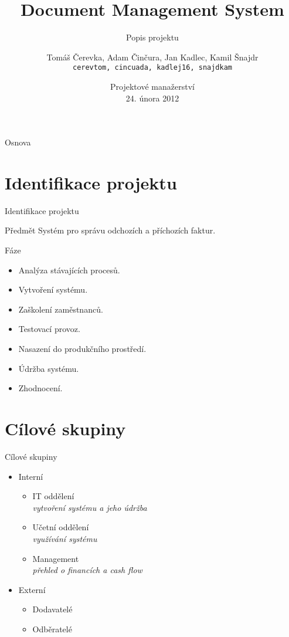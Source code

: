 \documentclass[10pt]{beamer}
\title[Document Management System]{Document Management System}
\subtitle{Popis projektu}
\author[Tomáš Čerevka] {
  Tomáš Čerevka, Adam Činčura, Jan Kadlec, Kamil Šnajdr \\
  {\tt cerevtom, cincuada, kadlej16, snajdkam}
}
\institute[ČVUT FIT] {
  Fakulta informačních technologií \\
  České vysoké učení technické \\
  Praha
}
\date[\today]{
Projektové manažerství \\
{\normalsize 24. února 2012}
}
\begin{document}
\begin{frame}[plain]
  \titlepage
\end{frame}

\begin{frame}{Osnova}{}
	\tableofcontents
\end{frame}

\section{Identifikace projektu}

\begin{frame}{Identifikace projektu}
	
	\begin{block}{Předmět}
		Systém pro správu odchozích a příchozích faktur.
	\end{block}
			
	\begin{block}{Fáze}
		\begin{itemize}
			\item Analýza stávajících procesů.
			\item Vytvoření systému.
			\item Zaškolení zaměstnanců.
			\item Testovací provoz.
			\item Nasazení do produkčního prostředí.
			\item Údržba systému.
			\item Zhodnocení.
		\end{itemize}
	\end{block}
\end{frame}

\section{Cílové skupiny}

\begin{frame}{Cílové skupiny}
	\begin{itemize}
		\item Interní
			\begin{itemize}
				\item IT oddělení \\ \textit{vytvoření systému a jeho údržba} \vspace{1em}
				\item Učetní oddělení \\ \textit{využívání systému} \vspace{1em}
				\item Management \\ \textit{přehled o financích a cash flow} \vspace{1em}
			\end{itemize}
		\item Externí
			\begin{itemize}
				\item Dodavatelé \vspace{1em}
				\item Odběratelé
			\end{itemize}
	\end{itemize}
\end{frame}
\end{document}
